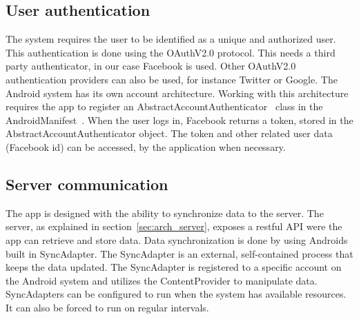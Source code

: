 \subsection{User authentication}

The system requires the user to be identified as a unique and authorized user. This authentication is done using the OAuthV2.0 protocol. This needs a third party authenticator, in our case Facebook is used. Other OAuthV2.0 authentication providers can also be used, for instance Twitter or Google.
The Android system has its own account architecture. Working with this architecture requires the app to register an AbstractAccountAuthenticator~\cite{androidAccount} class in the AndroidManifest~\cite{androidmanifest}. When the user logs in, Facebook returns a token, stored in the AbstractAccountAuthenticator object. The token and other related user data (Facebook id) can be accessed, by the application when necessary.

\subsection{Server communication}
The app is designed with the ability to synchronize data to the server. The server, as explained in section~\ref{sec:arch_server}, exposes a restful API were the app can retrieve and store data. Data synchronization is done by using Androids built in SyncAdapter. The SyncAdapter is an external, self-contained process that keeps the data updated. The SyncAdapter is registered to a specific account on the Android system and utilizes the ContentProvider to manipulate data. SyncAdapters can be configured to run when the system has available resources. It can also be forced to run on regular intervals.
